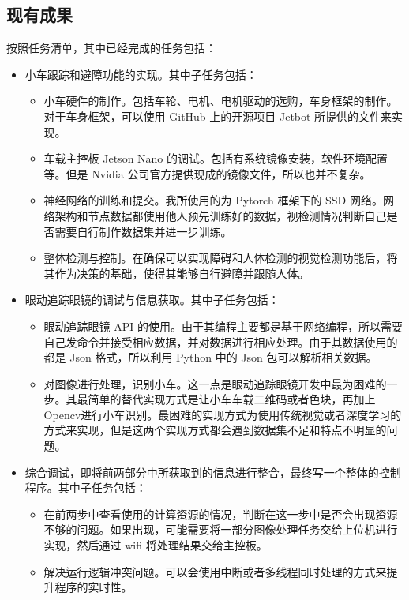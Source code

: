 \documentclass{article}
\begin{document}
\begin{spacing}{1.5}
\section{现有成果}

按照任务清单，其中已经完成的任务包括：

\begin{itemize}
    \item \CheckedBox 小车跟踪和避障功能的实现。其中子任务包括：

    \begin{itemize}
        \item \CheckedBox 小车硬件的制作。包括车轮、电机、电机驱动的选购，车身框架的制作。对于车身框架，可以使用 GitHub 上的开源项目 Jetbot 所提供的文件来实现。
        \item \CheckedBox 车载主控板 Jetson Nano 的调试。包括有系统镜像安装，软件环境配置等。但是 Nvidia 公司官方提供现成的镜像文件，所以也并不复杂。
        \item \CheckedBox 神经网络的训练和提交。我所使用的为 Pytorch 框架下的 SSD 网络。网络架构和节点数据都使用他人预先训练好的数据，视检测情况判断自己是否需要自行制作数据集并进一步训练。
        \item \CheckedBox 整体检测与控制。在确保可以实现障碍和人体检测的视觉检测功能后，将其作为决策的基础，使得其能够自行避障并跟随人体。
    \end{itemize}

    \item 眼动追踪眼镜的调试与信息获取。其中子任务包括：
    \begin{itemize}
        \item \CheckedBox 眼动追踪眼镜 API 的使用。由于其编程主要都是基于网络编程，所以需要自己发命令并接受相应数据，并对数据进行相应处理。由于其数据使用的都是 Json 格式，所以利用 Python 中的 Json 包可以解析相关数据。
        \item \CheckedBox 对图像进行处理，识别小车。这一点是眼动追踪眼镜开发中最为困难的一步。其最简单的替代实现方式是让小车车载二维码或者色块，再加上Opencv进行小车识别。最困难的实现方式为使用传统视觉或者深度学习的方式来实现，但是这两个实现方式都会遇到数据集不足和特点不明显的问题。
    \end{itemize}

    \item 综合调试，即将前两部分中所获取到的信息进行整合，最终写一个整体的控制程序。其中子任务包括：
    \begin{itemize}
        \item 在前两步中查看使用的计算资源的情况，判断在这一步中是否会出现资源不够的问题。如果出现，可能需要将一部分图像处理任务交给上位机进行实现，然后通过 wifi 将处理结果交给主控板。
        \item 解决运行逻辑冲突问题。可以会使用中断或者多线程同时处理的方式来提升程序的实时性。
    \end{itemize}
\end{itemize}


\end{spacing}
\end{document}
